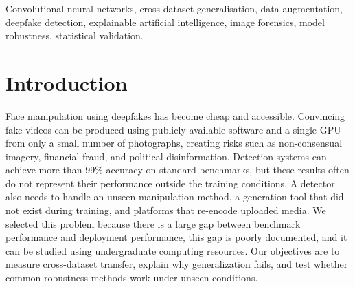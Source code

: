 \documentclass[journal,onecolumn]{IEEEtran}
\begin{document}
\begin{abstract}
significant gains and one significant loss across 15 unseen comparisons, with
the gains occurring only in cases where the corruption shares a physical
mechanism with the added training families.
The greatest gain comes from training-dataset diversity ($+0.280$ to $+0.305$
from more videos against $+0.066$ of an ensemble). On FaceForensics++, 0.8788
is reached with a dual RGB-DCT stream, while domain-adversarial training and
Grad-CAM supervision lose 0.031 and 0.006, respectively. For latent-diffusion
edits, the median AUC is 0.480, and of the nine checkpoints, four ranked
forgeries as more authentic than their real sources. Overall, generalization is
more related to a broader training set and stable manipulation cues than to
simply adding more types of corruption.
\end{abstract}

\begin{IEEEkeywords}
Convolutional neural networks, cross-dataset generalisation, data augmentation,
deepfake detection, explainable artificial intelligence, image forensics, model
robustness, statistical validation.
\end{IEEEkeywords}

\section{Introduction}
\label{sec:intro}

Face manipulation using deepfakes has become cheap and accessible. Convincing fake videos can be produced using publicly available software and a single GPU from only a small number of photographs, creating risks such as non-consensual imagery, financial fraud, and political disinformation. Detection systems can achieve more than 99\% accuracy on standard benchmarks, but these results often do not represent their performance outside the training conditions. A detector also needs to handle an unseen manipulation method, a generation tool that did not exist during training, and platforms that re-encode uploaded media. We selected this problem because there is a large gap between benchmark performance and deployment performance, this gap is poorly documented, and it can be studied using undergraduate computing resources. Our objectives are to measure cross-dataset transfer, explain why generalization fails, and test whether common robustness methods work under unseen conditions.
\end{document}
